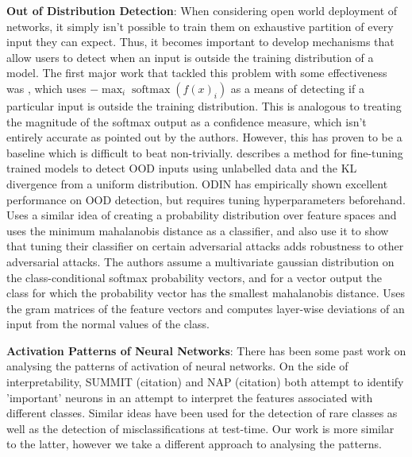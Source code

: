 \documentclass{article}
\DeclareMathOperator{\softmax}{softmax}
\begin{document}
            \textbf{Out of Distribution Detection}: When considering open world deployment of networks, it simply isn't possible to train them on exhaustive partition of every input they can expect. Thus, it becomes important to develop mechanisms that allow users to detect when an input is outside the training distribution of a model. The first major work that tackled this problem with some effectiveness was \cite{hendrycks2018baselinedetectingmisclassifiedoutofdistribution}, which uses $-\max_i \softmax(f(x)_i)$ as a means of detecting if a particular input is outside the training distribution. This is analogous to treating the magnitude of the softmax output as a confidence measure, which isn't entirely accurate as pointed out by the authors. However, this has proven to be a baseline which is difficult to beat non-trivially. \cite{hendrycks2019deepanomalydetectionoutlier} describes a method for fine-tuning trained models to detect OOD inputs using unlabelled data and the KL divergence from a uniform distribution. ODIN \cite{liang2020enhancingreliabilityoutofdistributionimage} has empirically shown excellent performance on OOD detection, but requires tuning hyperparameters beforehand. \cite{lee2018simpleunifiedframeworkdetecting} Uses a similar idea of creating a probability distribution over feature spaces and uses the minimum mahalanobis distance as a classifier, and also use it to show that tuning their classifier on certain adversarial attacks adds robustness to other adversarial attacks. The authors assume a multivariate gaussian distribution on the class-conditional softmax probability vectors, and for a vector output the class for which the probability vector has the smallest mahalanobis distance. \cite{sastry2020detectingoutofdistributionexamplesindistribution} Uses the gram matrices of the feature vectors and computes layer-wise deviations of an input from the normal values of the class.

            \textbf{Activation Patterns of Neural Networks}: There has been some past work on analysing the patterns of activation of neural networks. On the side of interpretability, SUMMIT (citation) and NAP (citation) both attempt to identify 'important' neurons in an attempt to interpret the features associated with different classes. Similar ideas have been used for the detection of rare classes as well as the detection of misclassifications at test-time. Our work is more similar to the latter, however we take a different approach to analysing the patterns.  
\end{document}
